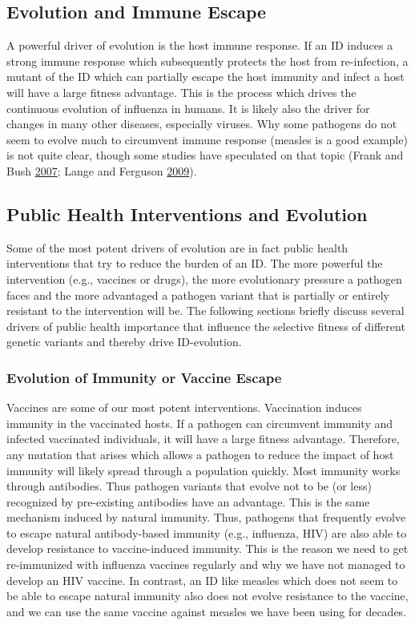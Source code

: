 \documentclass[]{article}
\theoremstyle{definition}
\theoremstyle{definition}
\theoremstyle{definition}
\theoremstyle{remark}
\begin{document}
\subsection{Evolution and Immune
Escape}\label{evolution-and-immune-escape}

A powerful driver of evolution is the host immune response. If an ID
induces a strong immune response which subsequently protects the host
from re-infection, a mutant of the ID which can partially escape the
host immunity and infect a host will have a large fitness advantage.
This is the process which drives the continuous evolution of influenza
in humans. It is likely also the driver for changes in many other
diseases, especially viruses. Why some pathogens do not seem to evolve
much to circumvent immune response (measles is a good example) is not
quite clear, though some studies have speculated on that topic (Frank
and Bush \protect\hyperlink{ref-frank07}{2007}; Lange and Ferguson
\protect\hyperlink{ref-lange09}{2009}).

\subsection{Public Health Interventions and
Evolution}\label{public-health-interventions-and-evolution}

Some of the most potent drivers of evolution are in fact public health
interventions that try to reduce the burden of an ID. The more powerful
the intervention (e.g., vaccines or drugs), the more evolutionary
pressure a pathogen faces and the more advantaged a pathogen variant
that is partially or entirely resistant to the intervention will be. The
following sections briefly discuss several drivers of public health
importance that influence the selective fitness of different genetic
variants and thereby drive ID-evolution.

\subsubsection{Evolution of Immunity or Vaccine
Escape}\label{evolution-of-immunity-or-vaccine-escape}

Vaccines are some of our most potent interventions. Vaccination induces
immunity in the vaccinated hosts. If a pathogen can circumvent immunity
and infected vaccinated individuals, it will have a large fitness
advantage. Therefore, any mutation that arises which allows a pathogen
to reduce the impact of host immunity will likely spread through a
population quickly. Most immunity works through antibodies. Thus
pathogen variants that evolve not to be (or less) recognized by
pre-existing antibodies have an advantage. This is the same mechanism
induced by natural immunity. Thus, pathogens that frequently evolve to
escape natural antibody-based immunity (e.g., influenza, HIV) are also
able to develop resistance to vaccine-induced immunity. This is the
reason we need to get re-immunized with influenza vaccines regularly and
why we have not managed to develop an HIV vaccine. In contrast, an ID
like measles which does not seem to be able to escape natural immunity
also does not evolve resistance to the vaccine, and we can use the same
vaccine against measles we have been using for decades.
\end{document}
